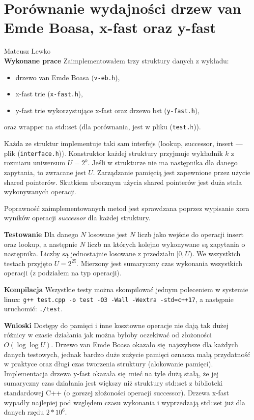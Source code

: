 \documentclass{article}
\begin{document}
\section*{Porównanie wydajności drzew van Emde Boasa, x-fast oraz y-fast}
Mateusz Lewko \\

\textbf{Wykonane prace}
Zaimplementowałem trzy struktury danych z wykładu:

\begin{itemize}
  \item drzewo van Emde Boasa (\texttt{v-eb.h}), 
  \item x-fast trie (\texttt{x-fast.h}),
  \item y-fast trie wykorzystujące x-fast oraz drzewo bst (\texttt{y-fast.h}),
\end{itemize}
oraz wrapper na std::set (dla porównania, jest w pliku (\texttt{test.h})).

Każda ze struktur implementuje taki sam interfejs (lookup, successor,
insert --- plik (\texttt{interface.h})).
Konstruktor każdej struktury przyjmuje wykładnik $k$ z rozmiaru uniwersum $U = 2^k$.
Jeśli w strukturze nie ma następnika dla danego zapytania, to zwracane jest $U$.
Zarządzanie pamięcią jest zapewnione przez użycie shared pointerów. Skutkiem ubocznym
użycia shared pointerów jest duża stała wykonywanych operacji.

Poprawność zaimplementowanych metod jest sprawdzana poprzez wypisanie xora
wyników operacji \textit{successor} dla każdej struktury.

\textbf{Testowanie}
Dla danego $N$ losowane jest $N$ liczb jako wejście do operacji insert oraz
lookup, a następnie $N$ liczb na
których kolejno wykonywane są zapytania o następnika. Liczby są
jednostajnie losowane z przedziału $[0, U)$. We wszystkich testach przyjęto
$U = 2^{25}$. Mierzony jest sumaryczny czas wykonania wszystkich operacji
(z podziałem na typ operacji).

\textbf{Kompilacja} Wszystkie testy można skompilować jednym poleceniem w
systemie linux: \texttt{g++ test.cpp -o test -O3 -Wall -Wextra -std=c++17},
a następnie uruchomić: \texttt{./test}.

\textbf{Wnioski} Dostępy do pamięci i inne kosztowne operacje nie dają tak
dużej różnicy w czasie działania jak można byłoby oczekiwać od złożoności $O(\log \log U)$.
Drzewo van Emde Boasa okazało się najszybsze dla każdych danych testowych, jednak
bardzo duże zużycie pamięci oznacza małą przydatność w praktyce oraz długi czas
tworzenia struktury (alokowanie pamięci). 
Implementacja drzewa y-fast okazała się mieć na tyle dużą
stałą, że jej sumaryczny czas działania jest większy niż struktury std::set z biblioteki
standardowej C++ (o gorszej złożoności operacji successor). 
Drzewa x-fast wypadły najlepiej pod względem czasu wykonania i wyprzedzają std::set już
dla danych rzędu $2 * 10^6$.
\end{document}
